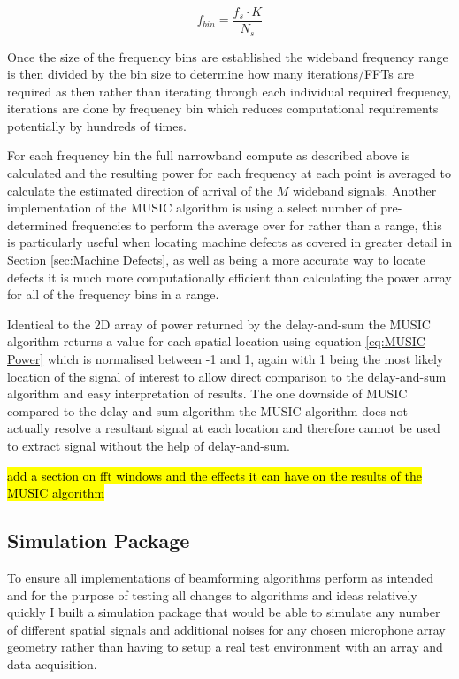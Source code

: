 \documentclass{UoNMCHA}
\numberwithin{equation}{section}
\begin{document}
    \begin{equation}
        f_{bin} =\frac{f_s \cdot K}{N_s}
    \end{equation}
    
    Once the size of the frequency bins are established the wideband frequency range is then divided by the bin size to determine how many iterations/FFTs are required as then rather than iterating through each individual required frequency, iterations are done by frequency bin which reduces computational requirements potentially by hundreds of times. 
    
    For each frequency bin the full narrowband compute as described above is calculated and the resulting power for each frequency at each point is averaged to calculate the estimated direction of arrival of the $M$ wideband signals. Another implementation of the MUSIC algorithm is using a select number of pre-determined frequencies to perform the average over for rather than a range, this is particularly useful when locating machine defects as covered in greater detail in Section \ref{sec:Machine Defects}, as well as being a more accurate way to locate defects it is much more computationally efficient than calculating the power array for all of the frequency bins in a range.
    
    Identical to the 2D array of power returned by the delay-and-sum the MUSIC algorithm returns a value for each spatial location using equation \ref{eq:MUSIC Power} which is normalised between -1 and 1, again with 1 being the most likely location of the signal of interest to allow direct comparison to the delay-and-sum algorithm and easy interpretation of results. The one downside of MUSIC compared to the delay-and-sum algorithm the MUSIC algorithm does not actually resolve a resultant signal at each location and therefore cannot be used to extract signal without the help of delay-and-sum. 
    
    \hl{add a section on fft windows and the effects it can have on the results of the MUSIC algorithm}
\subsection{Simulation Package} \label{sec:Software Sim}
    
    To ensure all implementations of beamforming algorithms perform as intended and for the purpose of testing all changes to algorithms and ideas relatively quickly I built a simulation package that would be able to simulate any number of different spatial signals and additional noises for any chosen microphone array geometry rather than having to setup a real test environment with an array and data acquisition.
    
\end{document}
